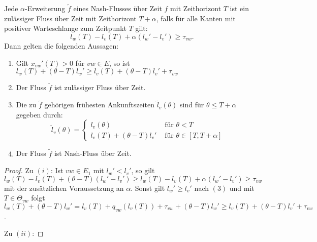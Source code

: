\begin{lemma}
	Jede $\alpha$-Erweiterung $\tilde{f}$ eines Nash-Flusses über Zeit $f$ mit Zeithorizont $T$ ist ein zulässiger Fluss über Zeit mit Zeithorizont $T+\alpha$, falls für alle Kanten mit positiver Warteschlange zum Zeitpunkt $T$ gilt:
	$$l_w(T) - l_v(T) + \alpha(l_w' - l_v') \geq \tau_{vw}.$$
	Dann gelten die folgenden Aussagen:
	\begin{enumerate}[label=(\roman*)]
		\item Gilt $x_{vw}'(T) > 0$ für $vw\in E$, so ist $l_w(T) + (\theta - T)l_w' \geq l_v(T) + (\theta - T)l_v' + \tau_{vw}$
		\item Der Fluss $\tilde{f}$ ist zulässiger Fluss über Zeit.
		\item Die zu $\tilde{f}$ gehörigen frühesten Ankunftszeiten $\tilde{l}_v(\theta)$ sind für $\theta \leq T+\alpha$ gegeben durch:
		$$\tilde{l}_v(\theta) = \begin{cases}
		l_v(\theta) & \text{ für $\theta < T$} \\
		l_v(T) + (\theta - T) l_v' & \text{ für $\theta \in [T, T+\alpha]$}
		\end{cases}$$
		\item Der Fluss $\tilde{f}$ ist Nash-Fluss über Zeit.
	\end{enumerate}
\end{lemma}
\begin{proof}
	Zu $(i)$: Ist $vw\in E_1$ mit $l_w'<l_v'$, so gilt
	$l_w(T)-l_v(T) + (\theta - T)(l_w' - l_v') \geq l_w(T)-l_v(T)+\alpha(l_w'- l_v')\geq \tau_{vw}$  mit der zusätzlichen Voraussetzung an $\alpha$.
	Sonst gilt $l_w' \geq l_v'$ nach $(3)$ und mit $T\in \Theta_{vw}$ folgt $l_w(T)+(\theta-T)l_w'=l_v(T) + q_{vw}(l_v(T))+\tau_{vw}+(\theta - T)l_w' \geq l_v(T) + (\theta-T)l_v'+\tau_{vw}$.
	
	Zu $(ii)$: 
\end{proof}